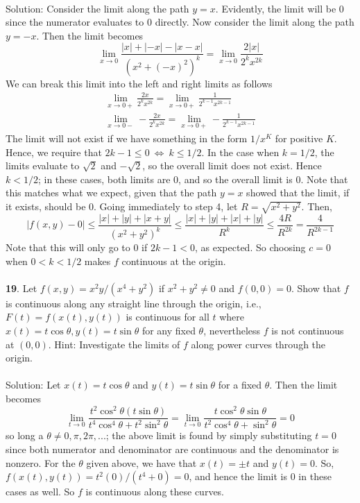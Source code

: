 \documentclass[12pt]{amsbook}
\begin{document}
\\
{\sc Solution}: Consider the limit along the path $y=x$. Evidently, the limit will be $0$ since the numerator evaluates to $0$ directly. Now consider the limit along the path $y=-x$. Then the limit becomes
$$\lim_{x \rightarrow 0}\frac{|x|+|-x|-|x-x|}{(x^2+(-x)^2)^k}=\lim_{x \rightarrow 0}\frac{2|x|}{2^kx^{2k}}$$
We can break this limit into the left and right limits as follows
\begin{eqnarray*}
\lim_{x \rightarrow 0+}\frac{2x}{2^kx^{2k}}=\lim_{x \rightarrow 0+}\frac{1}{2^{k-1}x^{2k-1}} \\
\lim_{x \rightarrow 0-}-\frac{2x}{2^kx^{2k}}=\lim_{x \rightarrow 0+}-\frac{1}{2^{k-1}x^{2k-1}} 
\end{eqnarray*}
The limit will not exist if we have something in the form $1/x^K$ for positive $K$. Hence, we require that $2k-1 \leq 0 \ \Leftrightarrow \ k \leq 1/2$. In the case when $k=1/2$, the limits evaluate to $\sqrt{2}$ and $-\sqrt{2}$, so the overall limit does not exist. Hence $k<1/2$; in these cases, both limits are 0, and so the overall limit is 0. Note that this matches what we expect, given that the path $y=x$ showed that the limit, if it exists, should be $0$. Going immediately to step 4, let $R=\sqrt{x^2+y^2}$. Then,
$$|f(x,y)-0| \leq \frac{|x|+|y|+|x+y|}{(x^2+y^2)^k} \leq \frac{|x|+|y|+|x|+|y|}{R^k} \leq \frac{4R}{R^{2k}}=\frac{4}{R^{2k-1}}$$
Note that this will only go to $0$ if $2k-1<0$, as expected. So choosing $c=0$ when $0<k<1/2$ makes $f$ continuous at the origin.
\\
\\
{\small\bf 19}. Let $f(x,y)=x^2y/(x^4+y^2)$ if $x^2+y^2 \neq 0$ and $f(0,0)=0$.
Show
that $f$ is continuous along any straight line through the origin, i.e., $F(t) =
f(x(t), y(t))$ is continuous for all $t$ where $x(t) = t \cos \theta, y(t) = t\sin \theta$ for
any fixed $\theta$, nevertheless $f$ is not continuous at $(0, 0)$. Hint: Investigate the
limits of $f$ along power curves through the origin.
\\
\\
{\sc Solution}: Let $x(t)=t\cos \theta$ and $y(t)=t\sin \theta$ for a fixed $\theta$. Then the limit becomes
$$\lim_{t \rightarrow 0} \frac{t^2\cos^2 \theta (t\sin \theta)}{t^4\cos^4 \theta+t^2\sin^2\theta}=\lim_{t \rightarrow 0} \frac{t\cos^2 \theta \sin \theta}{t^2\cos^4 \theta+\sin^2\theta}=0$$
so long a $\theta \neq 0, \pi, 2\pi,...$; the above limit is found by simply substituting $t=0$ since both numerator and denominator are continuous and the denominator is nonzero. For the $\theta$ given above, we have that $x(t)=\pm t$ and $y(t)=0$. So, $f(x(t),y(t))=t^2(0)/(t^4+0)=0$, and hence the limit is $0$ in these cases as well. So $f$ is continuous along these curves.
\end{document}
